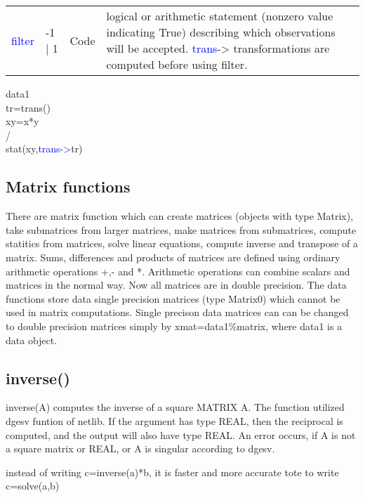 \vspace{-1.51em}
\begin{table}[H]
\begin{tabular}{ m{}  m{}m{}p{}}
\textcolor{blue}{filter} &-1 | 1&Code& logical or arithmetic statement (nonzero value indicating True) describing which observations will be accepted. \textcolor{blue}{trans}-> transformations are computed before using filter.
\\ \cline{1-4}
\end{tabular}
\end{table}
\begin{example}[comopt]data1\\
\label{comopt}
 tr=\textcolor{VioletRed}{trans}()\\
 xy=x*y\\
/\\
 \textcolor{VioletRed}{stat}(xy,\textcolor{blue}{trans->}tr)
\end{example}
\subsection{Matrix functions}
\label{matrix}
 There are matrix function which can create matrices (objects with type Matrix), take submatrices from larger matrices,
 make matrices from submatrices, compute statitics from matrices, solve linear equations,
 compute inverse and transpose of a matrix.
 Sums, differences and products of matrices are defined using ordinary arithmetic
 operations +,- and *. Arithmetic operations can combine scalars and matrices in the normal way.
 Now all matrices are in double precision. The data functions store data single precision
 matrices (type Matrix0) which cannot be used in matrix computations. Single precison data matrices can
 can be changed to double precision matrices simply by xmat=data1\%matrix, where data1 is a data object.
\subsection{inverse()}
\label{inverse}
 \textcolor{VioletRed}{inverse}(A) computes the inverse of a square MATRIX A. The function utilized dgesv funtion
 of netlib. If the argument has type REAL, then the reciprocal is computed,
 and the output will also have type REAL. An error occurs, if A is not
 a square matrix or REAL, or A is singular according to dgesv.
\begin{note}
instead of writing c=\textcolor{VioletRed}{inverse}(a)*b, it is faster and more accurate tote to
write c=\textcolor{VioletRed}{solve}(a,b)
\end{note}

